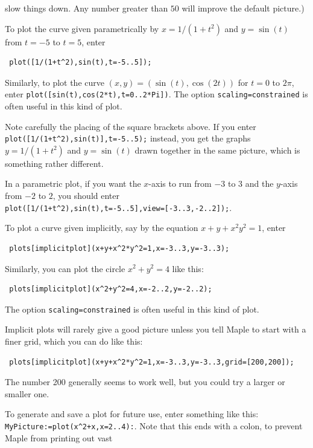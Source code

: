 \documentclass{amsart}
\begin{document}
\begin{secenum}
  slow things down.  Any number greater than $50$ will
  improve the default picture.)  
%
 \item\label{parametric} To plot the curve given parametrically by
  $x=1/(1+t^2)$ and $y=\sin(t)$ from $t=-5$ to $t=5$, enter
\begin{verbatim}
 plot([1/(1+t^2),sin(t),t=-5..5]);
\end{verbatim}
  Similarly, to plot the curve $(x,y)=(\sin(t),\cos(2t))$
  for $t=0$ to $2\pi$, enter
  \verb~plot([sin(t),cos(2*t),t=0..2*Pi])~. 
  The option \verb~scaling=constrained~ is often useful
  in this kind of plot.   
%
 \item\label{parametricbrackets}
  Note carefully the placing of the square brackets above.  If
  you enter \verb~plot([1/(1+t^2),sin(t)],t=-5..5);~
  instead, you get the graphs $y=1/(1+t^2)$ and $y=\sin(t)$
  drawn together in the same picture, which is something
  rather different. 
%
 \item\label{parametricrange}
  In a parametric plot, if you want the $x$-axis to run from $-3$
  to $3$ and  the $y$-axis from $-2$ to $2$, you should enter \\
  \verb~plot([1/(1+t^2),sin(t),t=-5..5],view=[-3..3,-2..2]);~. 
%
 \item\label{implicitplot} To plot a curve given implicitly, say
  by the equation $x+y+x^2y^2=1$, enter 
\begin{verbatim}
 plots[implicitplot](x+y+x^2*y^2=1,x=-3..3,y=-3..3);
\end{verbatim}
  Similarly, you can plot the circle $x^2+y^2=4$ like this:
\begin{verbatim}
 plots[implicitplot](x^2+y^2=4,x=-2..2,y=-2..2);
\end{verbatim}
  The option \verb~scaling=constrained~ is often useful
  in this kind of plot. 
%
 \item\label{grid}
  Implicit plots will rarely give a good picture unless you
  tell Maple to start with a finer grid, which you can do like this:
\begin{verbatim}
 plots[implicitplot](x+y+x^2*y^2=1,x=-3..3,y=-3..3,grid=[200,200]);
\end{verbatim}
  The number 200 generally seems to work well, but you could
  try a larger or smaller one. 
%
 \item\label{saveplot} To generate and save a plot for future use, enter
  something like this: \\
  \verb~MyPicture:=plot(x^2+x,x=2..4):~.  Note that this 
  ends with a colon, to prevent Maple from printing out vast

\end{secenum}
\end{document}
